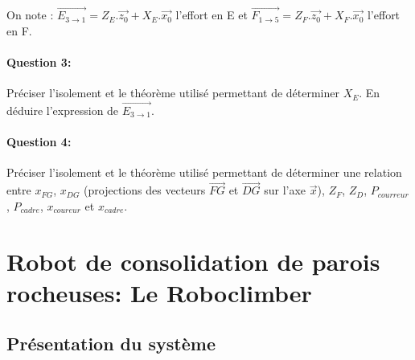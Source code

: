 On note : $\overrightarrow{E_{3 \rightarrow 1}}=Z_E.\overrightarrow{z_0}+X_E.\overrightarrow{x_0}$ l'effort en E et $\overrightarrow{F_{1 \rightarrow 5}}=Z_F.\overrightarrow{z_0}+X_F.\overrightarrow{x_0}$ l'effort en F.

\paragraph{Question 3:} Préciser l'isolement et le théorème utilisé permettant de déterminer $X_E$. En déduire l'expression de $\overrightarrow{E_{3 \rightarrow 1}}$.

\paragraph{Question 4:} Préciser l'isolement et le théorème utilisé permettant de déterminer une relation entre $x_{FG}$, $x_{DG}$ (projections des vecteurs $\overrightarrow{FG}$ et $\overrightarrow{DG}$ sur l'axe $\overrightarrow{x}$), $Z_F$, $Z_D$, $P_{courreur}$, $P_{cadre}$, $x_{coureur}$ et $x_{cadre}$.

\newpage

\section{Robot de consolidation de parois rocheuses: Le \og Roboclimber \fg}

\subsection{Présentation du système}

